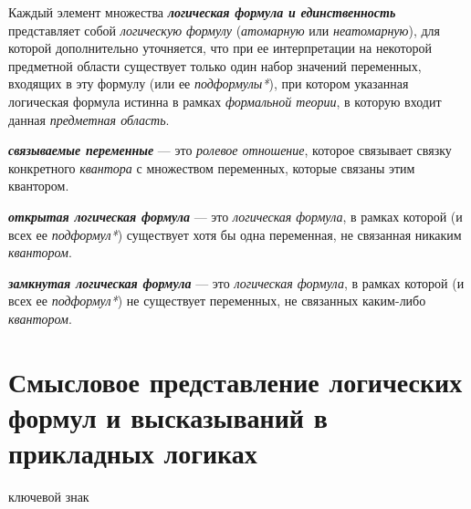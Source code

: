 Каждый элемент множества \textbf{\textit{логическая формула и единственность}} представляет собой \textit{логическую формулу} (\textit{атомарную} или \textit{неатомарную}), для которой дополнительно уточняется, что при ее интерпретации на некоторой предметной области существует только один набор значений переменных, входящих в эту формулу (или ее \textit{подформулы*}), при котором указанная логическая формула истинна в рамках \textit{формальной теории}, в которую входит данная \textit{предметная область}.



\textbf{\textit{связываемые переменные\scnrolesign}} --- это \textit{ролевое отношение}, которое связывает связку конкретного \textit{квантора} с множеством переменных, которые связаны этим квантором.

\textbf{\textit{открытая логическая формула}} --- это \textit{логическая формула}, в рамках которой (и всех ее \textit{подформул*}) существует хотя бы одна переменная, не связанная никаким \textit{квантором}.

\textbf{\textit{замкнутая логическая формула}} --- это \textit{логическая формула}, в рамках которой (и всех ее \textit{подформул*}) не существует переменных, не связанных каким-либо \textit{квантором}.


\section{Смысловое представление логических формул и высказываний в прикладных логиках}
\label{sec_applied_logic}

\begin{SCn}
	\begin{scnrelfromlist}{ключевой знак}
	\end{scnrelfromlist}
\end{SCn}

